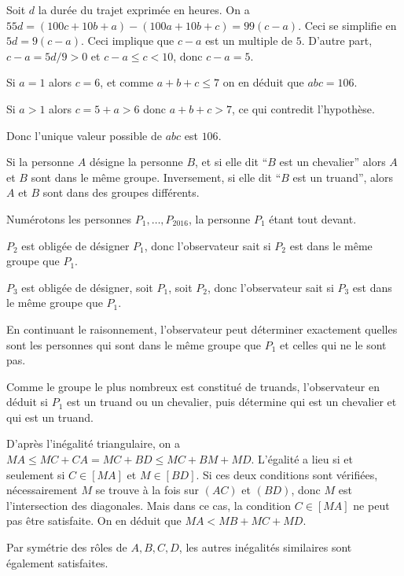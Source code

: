 \bigskip

\begin{sol}
 Soit $d$ la dur\'ee du trajet exprim\'ee en heures. On a $55d=(100c+10b+a)-(100a+10b+c)=99(c-a)$.
Ceci se simplifie en $5d=9(c-a)$. Ceci implique que $c-a$ est un multiple de $5$.
D'autre part, $c-a=5d/9>0$ et $c-a\leqslant c<10$, donc $c-a=5$.

Si $a=1$ alors $c=6$, et comme $a+b+c\leqslant 7$ on en d\'eduit que $abc=106$.

Si $a>1$ alors $c=5+a>6$ donc $a+b+c>7$, ce qui contredit l'hypoth\`ese.

Donc l'unique valeur possible de $abc$ est $106$.
\end{sol}

\begin{sol}
 Si la personne $A$ d\'esigne la personne $B$, et si elle dit ``$B$ est un chevalier'' alors
$A$ et $B$ sont dans le m\^eme groupe. Inversement, si elle dit ``$B$ est un truand'',
alors $A$ et $B$ sont dans des groupes diff\'erents.

Num\'erotons les personnes $P_1,\ldots,P_{2016}$, la personne $P_1$ \'etant tout devant.

$P_2$ est oblig\'ee de d\'esigner $P_1$, donc l'observateur sait
si $P_2$ est dans le m\^eme groupe que $P_1$.

$P_3$ est oblig\'ee de d\'esigner, soit $P_1$, soit $P_2$, donc l'observateur sait
si $P_3$ est dans le m\^eme groupe que $P_1$.

En continuant le raisonnement, l'observateur peut d\'eterminer exactement quelles sont
les personnes qui sont dans le m\^eme groupe que $P_1$ et celles qui ne le sont pas.

Comme le groupe le plus nombreux est constitu\'e de truands, l'observateur en d\'eduit
si $P_1$ est un truand ou un chevalier, puis d\'etermine qui est un chevalier et qui est un truand.
\end{sol}

\begin{sol}
 D'apr\`es l'in\'egalit\'e triangulaire, on a $MA\leqslant MC+CA=MC+BD\leqslant MC+BM+MD$.
L'\'egalit\'e a lieu si et seulement si $C\in [MA]$ et $M\in [BD]$. Si ces deux conditions sont
v\'erifi\'ees, n\'ecessairement $M$ se trouve \`a la fois sur $(AC)$ et $(BD)$, donc
$M$ est l'intersection des diagonales. Mais dans ce cas, la condition $C\in [MA]$ ne
peut pas \^etre satisfaite. On en d\'eduit que $MA<MB+MC+MD$.

Par sym\'etrie des r\^oles de $A,B,C,D$, les autres in\'egalit\'es similaires sont \'egalement
satisfaites.
\end{sol}

